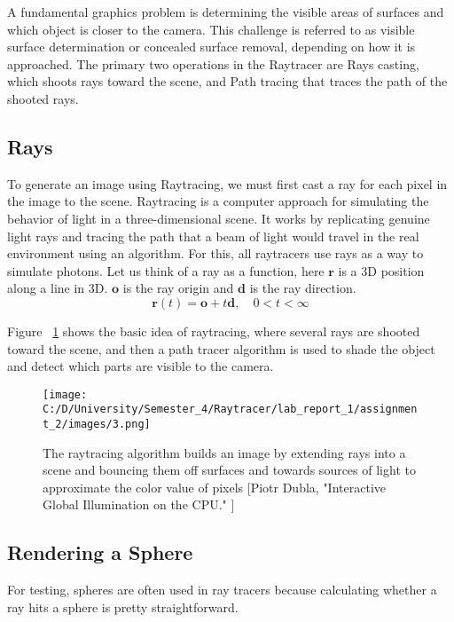 \documentclass{article}
\begin{document}
	A fundamental graphics problem is determining the visible areas of surfaces and which object is closer to the camera. This challenge is referred to as visible surface determination or concealed surface removal, depending on how it is approached. The primary two operations in the Raytracer are Rays casting, which shoots rays toward the scene, and Path tracing that traces the path of the shooted rays.
	
	\subsection{Rays}
	To generate an image using Raytracing, we must first cast a ray for each pixel in the image to the scene.
	Raytracing is a computer approach for simulating the behavior of light in a three-dimensional scene. It works by replicating genuine light rays and tracing the path that a beam of light would travel in the real environment using an algorithm. 
	For this, all raytracers use rays as a way to simulate photons. Let us think of a ray as a function, here $\pmb{r} $ is a 3D position along a line
	in 3D. $\pmb{o} $ is the ray origin and $\pmb{d} $ is the ray direction.
		\begin{equation}
\pmb{r} (t) = \pmb{o} + t\pmb{d} ,  \quad  0 < t < \infty
	\end{equation}
	
	Figure ~\ref{fig:1} shows the basic idea of raytracing, where several rays are shooted toward the scene, and then a path tracer algorithm is used to shade the object and detect which parts are visible to the camera.
	\begin{figure}[H]
		\begin{center}
			\texttt{[image: C:/D/University/Semester\_4/Raytracer/lab\_report\_1/assignment\_2/images/3.png]}
			
			\caption{The raytracing algorithm builds an image by extending rays into a scene and bouncing them off surfaces and towards sources of light to approximate the color value of pixels [Piotr Dubla, "Interactive Global Illumination on the CPU."
				]}
			\label{fig:1}
		\end{center}
	\end{figure}
	
	\subsection{Rendering a Sphere}
	For testing, spheres are often used in ray tracers because
	calculating whether a ray hits a sphere is pretty straightforward.
	
\end{document}
